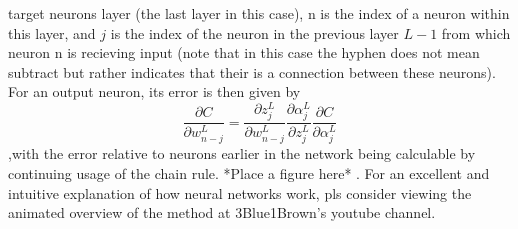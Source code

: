 target neurons layer (the last layer in this case), n is the index of
a neuron within this layer, and $j$ is the index of the neuron in the
previous layer $L-1$ from which neuron n is recieving input (note
that in this case the hyphen does not mean subtract but rather
indicates that their is a connection between these
neurons). For an output neuron, its error is then given by
$$\frac{\partial C}{\partial w^{L}_{n-j}} = \frac{\partial z^{L}_{j}}{\partial w^{L}_{n-j}}\frac{\partial \alpha^{L}_{j}}{\partial z^{L}_{j}}\frac{\partial C}{\partial \alpha^{L}_{j}}$$
,with the error relative to neurons
earlier in the network being calculable by continuing usage of the
chain rule. *Place a figure here* . For an excellent and intuitive
explanation of how neural networks work, pls consider viewing the
animated overview of the method at 3Blue1Brown's youtube channel.
